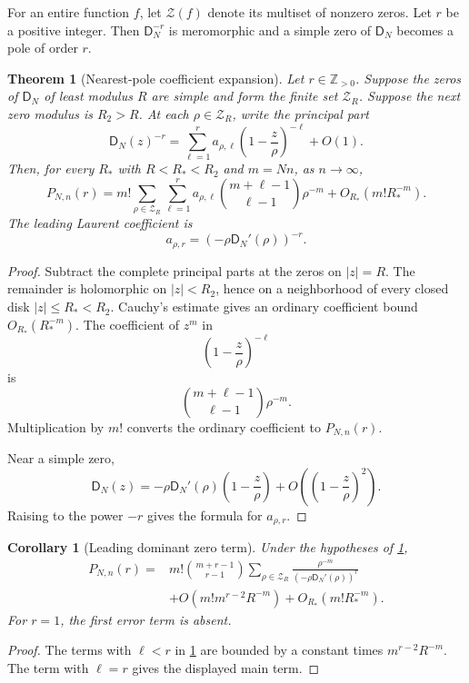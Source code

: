 \documentclass[11pt,letterpaper]{article}
\newtheorem{theorem}{Theorem}[section]
\newtheorem{corollary}[corollary]{Corollary}
\theoremstyle{definition}
\theoremstyle{remark}
\newcommand{\ZZ}{\mathbb Z}
\newcommand{\Zcal}{\mathcal Z}
\newcommand{\Dfun}{\mathsf D}
\begin{document}
For an entire function $f$, let $\Zcal(f)$ denote its multiset of nonzero zeros.  Let $r$ be a positive integer.  Then $\Dfun_N^{-r}$ is meromorphic and a simple zero of $\Dfun_N$ becomes a pole of order $r$.

\begin{theorem}[Nearest-pole coefficient expansion]\label{thm:nearest_circle_expansion}
Let $r\in\ZZ_{>0}$.  Suppose the zeros of $\Dfun_N$ of least modulus
$R$ are simple and form the finite set $\Zcal_R$.  Suppose the next
zero modulus is $R_2>R$.  At each $\rho\in\Zcal_R$, write the principal
part
\[
\Dfun_N(z)^{-r}
=
\sum_{\ell=1}^{r}
 a_{\rho,\ell}
\left(1-\frac z\rho\right)^{-\ell}
+
O(1).
\]
Then, for every $R_*$ with $R<R_*<R_2$ and $m=Nn$, as $n\to\infty$,
\[
P_{N,n}(r)
=
 m!
\sum_{\rho\in\Zcal_R}
\sum_{\ell=1}^{r}
 a_{\rho,\ell}
\binom{m+\ell-1}{\ell-1}
\rho^{-m}
+
O_{R_*}(m!R_*^{-m}).
\]
The leading Laurent coefficient is
\[
a_{\rho,r}
=
(-\rho\Dfun_N'(\rho))^{-r}.
\]
\end{theorem}

\begin{proof}
Subtract the complete principal parts at the zeros on $|z|=R$.  The remainder is holomorphic on $|z|<R_2$, hence on a neighborhood of every closed disk $|z|\leq R_*<R_2$.  Cauchy's estimate gives an ordinary coefficient bound $O_{R_*}(R_*^{-m})$.  The coefficient of $z^m$ in
\[
\left(1-\frac z\rho\right)^{-\ell}
\]
is
\[
\binom{m+\ell-1}{\ell-1}\rho^{-m}.
\]
Multiplication by $m!$ converts the ordinary coefficient to $P_{N,n}(r)$.

Near a simple zero,
\[
\Dfun_N(z)
=
-\rho\Dfun_N'(\rho)
\left(1-\frac z\rho\right)
+O\left(\left(1-\frac z\rho\right)^2\right).
\]
Raising to the power $-r$ gives the formula for $a_{\rho,r}$.
\end{proof}

\begin{corollary}[Leading dominant zero term]\label{cor:leading_dominant_zero}
Under the hypotheses of \cref{thm:nearest_circle_expansion},
\[
\begin{aligned}
P_{N,n}(r)
={}&m!\binom{m+r-1}{r-1}
\sum_{\rho\in\Zcal_R}
\frac{\rho^{-m}}{(-\rho\Dfun_N'(\rho))^r}
\\
&+O\left(m!m^{r-2}R^{-m}\right)
+O_{R_*}\left(m!R_*^{-m}\right).
\end{aligned}
\]
For $r=1$, the first error term is absent.
\end{corollary}

\begin{proof}
The terms with $\ell<r$ in \cref{thm:nearest_circle_expansion} are bounded by a constant times $m^{r-2}R^{-m}$.  The term with $\ell=r$ gives the displayed main term.
\end{proof}
\end{document}
